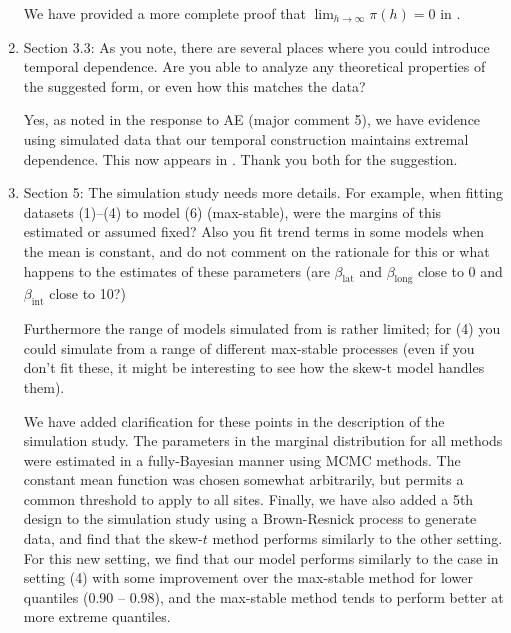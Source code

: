 \documentclass[11pt]{article}
\begin{document}
\begin{enumerate}[1.]
  \begin{response}
    We have provided a more complete proof that $\lim_{h \rightarrow \infty} \pi(h) = 0$ in .
  \end{response}

  \item Section 3.3: As you note, there are several places where you could introduce temporal dependence. Are you able to analyze any theoretical properties of the suggested form, or even how this matches the data? \\

  \begin{response}
    Yes, as noted in the response to AE (major comment 5), we have evidence using simulated data that our temporal construction maintains extremal dependence.
    This now appears in .
    Thank you both for the suggestion.
  \end{response}

  \item Section 5: The simulation study needs more details. For example, when fitting datasets (1)--(4) to model (6) (max-stable), were the margins of this estimated or assumed fixed? Also you fit trend terms in some models when the mean is constant, and do not comment on the rationale for this or what happens to the estimates of these parameters (are $\beta_\text{lat}$ and $\beta_\text{long}$ close to 0 and $\beta_\text{int}$ close to 10?)

  Furthermore the range of models simulated from is rather limited; for (4) you could simulate from a range of different max-stable processes (even if you don’t fit these, it might be interesting to see how the skew-t model handles them). \\

  \begin{response}
    We have added clarification for these points in the description of the simulation study.
    The parameters in the marginal distribution for all methods were estimated in a fully-Bayesian manner using MCMC methods.
    The constant mean function was chosen somewhat arbitrarily, but permits a common threshold to apply to all sites.
    Finally, we have also added a 5th design to the simulation study using a Brown-Resnick process to generate data, and find that the skew-$t$ method performs similarly to the other setting.
    For this new setting, we find that our model performs similarly to the case in setting (4) with some improvement over the max-stable method for lower quantiles (0.90 -- 0.98), and the max-stable method tends to perform better at more extreme quantiles.
  \end{response}


\end{enumerate}
\end{document}
